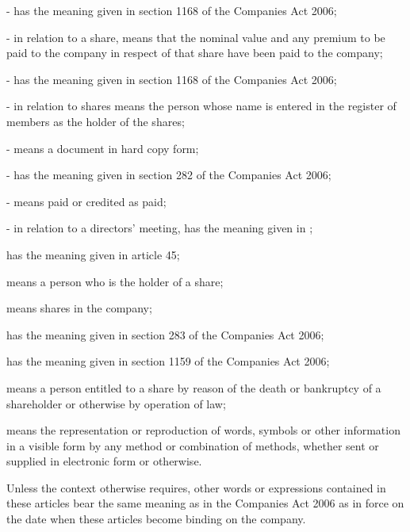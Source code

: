 \documentclass[letterpaper,10pt,english]{sphinxmanual}
\begin{document}
 - has the meaning given in section 1168 of the Companies Act 2006;

 - in relation to a share, means that the nominal value and any premium to be paid to the company in respect of that share have been paid to the company;

 - has the meaning given in section 1168 of the Companies Act 2006;

 - in relation to shares means the person whose name is entered in the register of members as the holder of the shares;

 - means a document in hard copy form;

 - has the meaning given in section 282 of the Companies Act 2006;

 - means paid or credited as paid;

 - in relation to a directors’ meeting, has the meaning given in {\hyperref[\detokenize{directors:article-10}]{}};

 has the meaning given in article 45;

 means a person who is the holder of a share;

 means shares in the company;

 has the meaning given in section 283 of the Companies Act 2006;

 has the meaning given in section 1159 of the Companies Act 2006;

 means a person entitled to a share by reason of the death or bankruptcy of a shareholder or otherwise by operation of law;

 means the representation or reproduction of words, symbols or other information in a visible form by any method or combination of methods, whether sent or supplied in electronic form or otherwise.

Unless the context otherwise requires, other words or expressions contained in these articles bear the same meaning as in the Companies Act 2006 as in force on the date when these articles become binding on the company.
\end{document}
